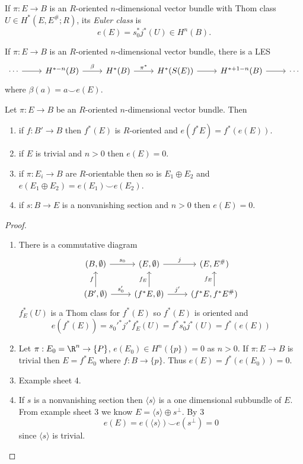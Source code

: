 \documentclass[a4paper]{article}
\newcommand*{\cp}{\smile} %
\begin{document}
\begin{definition}
  If \(\pi: E \to B\) is an \(R\)-oriented \(n\)-dimensional vector bundle with Thom class \(U \in H^*(E, E^\#; R)\), its \emph{Euler class} is
  \[
    e(E) = s_0^*j^*(U) \in H^n(B).
  \]
\end{definition}

\begin{theorem}
  If \(\pi: E \to B\) is an \(R\)-oriented \(n\)-dimensional vector bundle, there is a LES
  \[
    \begin{tikzcd}
      \cdots \ar[r] & H^{* - n}(B) \ar[r, "\beta"] & H^*(B) \ar[r, "\pi^*"] & H^*(S(E)) \ar[r] & H^{* + 1 - n}(B) \ar[r] & \cdots
    \end{tikzcd}
  \]
  where \(\beta(a) = a \cp e(E)\).
\end{theorem}

\begin{proposition}
  Let \(\pi: E \to B\) be an \(R\)-oriented \(n\)-dimensional vector bundle. Then
  \begin{enumerate}
  \item if \(f: B' \to B\) then \(f^*(E)\) is \(R\)-oriented and \(e(f^*E) = f^*(e(E))\).
  \item if \(E\) is trivial and \(n > 0\) then \(e(E) = 0\).
  \item if \(\pi: E_i \to B\) are \(R\)-orientable then so is \(E_1 \oplus E_2\) and \(e(E_1 \oplus E_2) = e(E_1) \cp e(E_2)\).
  \item if \(s: B \to E\) is a nonvanishing section and \(n > 0\) then \(e(E) = 0\).
  \end{enumerate}
\end{proposition}

\begin{proof}\leavevmode
  \begin{enumerate}
  \item There is a commutative diagram
    \[
      \begin{tikzcd}
        (B, \emptyset) \ar[r, "s_0"] & (E, \emptyset) \ar[r, "j"] & (E, E^\#) \\
        (B', \emptyset) \ar[r, "s_0'"] \ar[u, "f"] & (f^*E, \emptyset) \ar[r, "j'"] \ar[u, "f_E"] & (f^*E, f^*E^\#) \ar[u, "f_E"]
      \end{tikzcd}
    \]
    \(f_E^*(U)\) is a Thom class for \(f^*(E)\) so \(f^*(E)\) is oriented and
    \[
      e(f^*(E))
      = s_0'^* j'^* f_E^*(U)
      = f^* s_0^* j^*(U)
      = f^*(e(E))
    \]
  \item Let \(\pi: E_0 = \R^n \to \{P\}\), \(e(E_0) \in H^n(\{p\}) = 0\) as \(n > 0\). If \(\pi: E \to B\) is trivial then \(E = f^*E_0\) where \(f: B \to \{p\}\). Thus \(e(E) = f^*(e(E_0)) = 0\).
  \item Example sheet 4.
  \item If \(s\) is a nonvanishing section then \(\langle s \rangle\) is a one dimensional subbundle of \(E\). From example sheet 3 we know \(E = \langle s\rangle \oplus s^\perp\). By 3
    \[
      e(E) = e(\langle s\rangle) \cp e(s^\perp) = 0
    \]
    since \(\langle s\rangle\) is trivial.
  \end{enumerate}
\end{proof}
\end{document}
